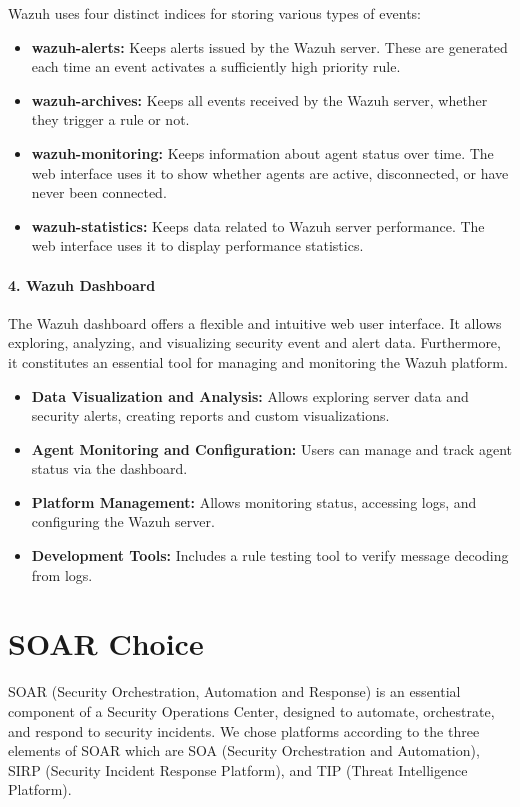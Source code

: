 Wazuh uses four distinct indices for storing various types of events:
\begin{itemize}
    \item \textbf{wazuh-alerts:} Keeps alerts issued by the Wazuh server. These are generated each time an event activates a sufficiently high priority rule.
    \item \textbf{wazuh-archives:} Keeps all events received by the Wazuh server, whether they trigger a rule or not.
    \item \textbf{wazuh-monitoring:} Keeps information about agent status over time. The web interface uses it to show whether agents are active, disconnected, or have never been connected.
    \item \textbf{wazuh-statistics:} Keeps data related to Wazuh server performance. The web interface uses it to display performance statistics.
\end{itemize}

\paragraph{4. Wazuh Dashboard \cite{wazuh-dashboard}}
\label{par:wazuh-dashboard}

The Wazuh dashboard offers a flexible and intuitive web user interface. It allows exploring, analyzing, and visualizing security event and alert data. Furthermore, it constitutes an essential tool for managing and monitoring the Wazuh platform.
\begin{itemize}
    \item \textbf{Data Visualization and Analysis:} Allows exploring server data and security alerts, creating reports and custom visualizations.
    \item \textbf{Agent Monitoring and Configuration:} Users can manage and track agent status via the dashboard.
    \item \textbf{Platform Management:} Allows monitoring status, accessing logs, and configuring the Wazuh server.
    \item \textbf{Development Tools:} Includes a rule testing tool to verify message decoding from logs.
\end{itemize}


\section{SOAR Choice}
\label{sec:soar}

SOAR (Security Orchestration, Automation and Response) is an essential component of a Security Operations Center, designed to automate, orchestrate, and respond to security incidents. We chose platforms according to the three elements of SOAR which are SOA (Security Orchestration and Automation), SIRP (Security Incident Response Platform), and TIP (Threat Intelligence Platform).

